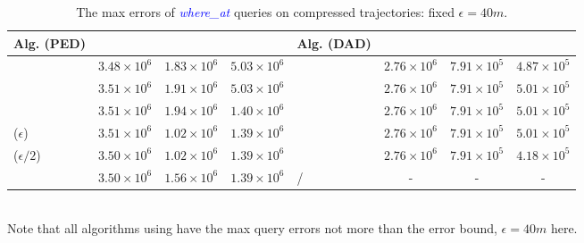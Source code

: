 \begin{table}
	\caption{\small The max errors of \textcolor{blue}{\emph{where\_at}} queries on compressed trajectories: fixed $\epsilon=40m$.}
	\centering
	\scriptsize
	\vspace{-1ex}
	\begin{tabular}{|l|c|c|c|l|c|c|c|}
		\hline
		\bf{Alg. (PED)}  &\ucar &\geolife &\mopsi & \bf{Alg. (DAD)}  &\ucar &\geolife &\mopsi \\
		\hline
		{\dpa} &	$3.48 \times 10^6$ & $1.83 \times 10^6$ &	$5.03 \times 10^6$	& \dpa	& $2.76 \times 10^6$	& $7.91 \times 10^5$	& $4.87 \times 10^5$ \\
		\hline
		{\tpa} &	$3.51 \times 10^6$ & $1.91 \times 10^6$ &	$5.03 \times 10^6$	& \tpa	& $2.76 \times 10^6$	& $7.91 \times 10^5$	& $5.01 \times 10^5$ \\
		\hline
		{\bqsa} &	$3.51 \times 10^6$ & $1.94 \times 10^6$ &	$1.40 \times 10^6$	& \opwa	& $2.76 \times 10^6$	& $7.91 \times 10^5$	& $5.01 \times 10^5$ \\
		\hline
		{\siped($\epsilon$)} &	$3.51 \times 10^6$ & $1.02 \times 10^6$ &	$1.39 \times 10^6$	& \interval	& $2.76 \times 10^6$	& $7.91 \times 10^5$	& $5.01 \times 10^5$ \\
		\hline
		{\siped($\epsilon/2$)} &	$3.50 \times 10^6$ & $1.02 \times 10^6$ &	$1.39 \times 10^6$	& \intersec	& $2.76 \times 10^6$	& $7.91 \times 10^5$	& $4.18 \times 10^5$ \\
		\hline
		{\operb} &	$3.50 \times 10^6$ & $1.56 \times 10^6$ &	$1.39 \times 10^6$	& / & -  & - & -  \\
		\hline
	\end{tabular}
	\label{tab:query-me}
	\vspace{0.5ex}
	\\{Note that all algorithms using \sed have the max query errors not more than the error bound, \ie $\epsilon=40m$ here.}
	\vspace{-1ex}
\end{table}


